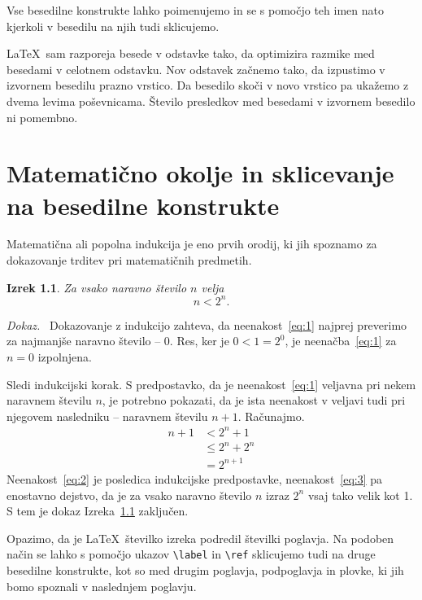 \documentclass[a4paper,12pt,openright]{book}
\newtheorem{izrek}{Izrek}[chapter]
\newenvironment{dokaz}{\emph{Dokaz.}\ }{\hspace{\fill}{$\Box$}}
\begin{document}
Vse besedilne konstrukte lahko poimenujemo in se s pomočjo teh imen nato  kjerkoli v besedilu na njih  tudi sklicujemo.

\LaTeX\ sam razporeja besede v odstavke tako, da optimizira razmike med besedami v celotnem odstavku.
Nov odstavek začnemo tako, da izpustimo v izvornem besedilu prazno vrstico. Da besedilo skoči v novo vrstico pa ukažemo z dvema levima poševnicama.
Število presledkov med besedami v izvornem besedilo ni pomembno.


\chapter{Matematično okolje in sklicevanje na besedilne konstrukte}
\label{ch1}

Matematična ali popolna indukcija je eno prvih orodij, ki jih spoznamo za dokazovanje trditev pri matematičnih predmetih.
\begin{izrek}
\label{iz:1}
Za vsako naravno število $n$ velja
\begin{equation}
n < 2^n.
\label{eq:1}
\end{equation}
\end{izrek}
\begin{dokaz}
Dokazovanje z indukcijo zahteva, da neenakost~\eqref{eq:1} najprej preverimo za najmanjše naravno število -- $0$. 
Res, ker je $0 < 1 = 2^0$, je neenačba~\eqref{eq:1} za $n=0$ izpolnjena.

Sledi indukcijski korak. S predpostavko, da je neenakost~\eqref{eq:1} veljavna pri nekem naravnem številu $n$, je potrebno pokazati, da je ista neenakost v veljavi tudi pri njegovem nasledniku -- naravnem številu $n+1$. 
Računajmo.
\begin{align}
n+1 & < 2^n + 1       \label{eq:2}\\
       & \le 2^n + 2^n \label{eq:3}\\
       & = 2^{n+1}       \nonumber
\end{align}
Neenakost~\eqref{eq:2} je posledica indukcijske predpostavke, neenakost~\eqref{eq:3} pa enostavno dejstvo, da je za vsako naravno število $n$ izraz $2^n$ vsaj tako velik kot 1. 
S tem je dokaz Izreka~\ref{iz:1} zaključen.
\end{dokaz}

Opazimo, da je \LaTeX\ številko izreka podredil številki poglavja.
Na podoben način se lahko s pomočjo ukazov \verb|\label| in \verb|\ref| sklicujemo tudi na druge besedilne konstrukte, kot so med drugim poglavja, podpoglavja in plovke, ki jih bomo spoznali v naslednjem poglavju.
\end{document}
